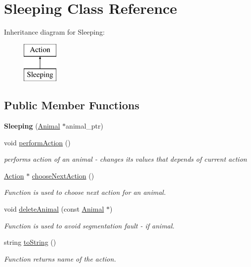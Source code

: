 \hypertarget{class_sleeping}{}\section{Sleeping Class Reference}
\label{class_sleeping}
Inheritance diagram for Sleeping\+:\begin{figure}[H]
\begin{center}
\leavevmode
\includegraphics[height=2.000000cm]{class_sleeping}
\end{center}
\end{figure}
\subsection*{Public Member Functions}
\begin{DoxyCompactItemize}
\item 
\hypertarget{class_sleeping_a647c313fc4ba4ffd5c9fc28713fae267}{}{\bfseries Sleeping} (\hyperlink{class_animal}{Animal} $\ast$animal\+\_\+ptr)\label{class_sleeping_a647c313fc4ba4ffd5c9fc28713fae267}

\item 
void \hyperlink{class_sleeping_a075291ac36c4c702728c1c6029a30ed7}{perform\+Action} ()
\begin{DoxyCompactList}\small\item\em performs action of an animal -\/ changes it\textquotesingle{}s values that depends of current action \end{DoxyCompactList}\item 
\hyperlink{class_action}{Action} $\ast$ \hyperlink{class_sleeping_ab7e0642b9b9a7acdf61c5dcd0bc41e59}{choose\+Next\+Action} ()
\begin{DoxyCompactList}\small\item\em Function is used to choose next action for an animal. \end{DoxyCompactList}\item 
void \hyperlink{class_sleeping_ab89f2382c544e14fad56c4476e7aad0e}{delete\+Animal} (const \hyperlink{class_animal}{Animal} $\ast$)
\begin{DoxyCompactList}\small\item\em Function is used to avoid segmentation fault -\/ if animal. \end{DoxyCompactList}\item 
string \hyperlink{class_sleeping_a7a9f89f9febd753e6eb99618cb714440}{to\+String} ()
\begin{DoxyCompactList}\small\item\em Function returns name of the action. \end{DoxyCompactList}\end{DoxyCompactItemize}
